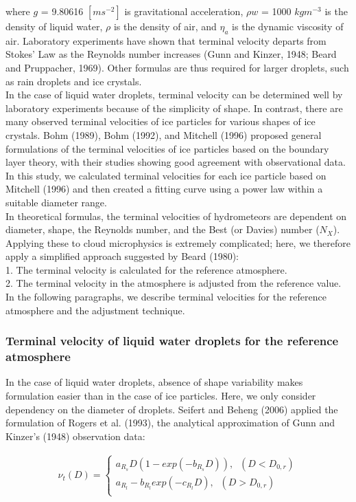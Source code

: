 where $g$ = 9.80616 $[m s^{-2}]$ is gravitational acceleration, $\rho w$ = 1000 $kg m^{-3}$ is the density of liquid water, $\rho$ is the density of air, and $\eta_{a}$ is the dynamic viscosity of air. Laboratory experiments have shown that terminal velocity departs from Stokes’ Law as the Reynolds number increases (Gunn and Kinzer, 1948; Beard and Pruppacher, 1969). Other formulas are thus required for larger droplets, such as rain droplets and ice crystals.\\
In the case of liquid water droplets, terminal velocity can be determined well by laboratory experiments because of the simplicity of shape. In contrast, there are many observed terminal velocities of ice particles for various shapes of ice crystals. Bohm (1989), Bohm (1992), and Mitchell (1996) proposed general formulations of the terminal velocities of ice particles based on the boundary layer theory, with their studies showing good agreement with observational data. In this study, we calculated terminal velocities for each ice particle based on Mitchell (1996) and then created a fitting curve using a power law within a suitable diameter range. \\
In theoretical formulas, the terminal velocities of hydrometeors are dependent on diameter, shape, the Reynolds number, and the Best (or Davies) number ($N_{X}$). Applying these to cloud microphysics is extremely complicated; here, we therefore apply a simplified approach suggested by Beard (1980):\\
1. The terminal velocity is calculated for the reference atmosphere.\\
2. The terminal velocity in the atmosphere is adjusted from the reference value.\\
In the following paragraphs, we describe terminal velocities for the reference atmosphere and the adjustment technique.

\subsubsection{Terminal velocity of liquid water droplets for the reference atmosphere}
In the case of liquid water droplets, absence of shape variability makes formulation easier than in the case of ice particles. Here, we only consider dependency on the diameter of droplets. Seifert and Beheng (2006) applied the formulation of Rogers et al. (1993), the analytical approximation of Gunn and Kinzer’s (1948) observation data:

\begin{eqnarray}
\nu_{t}(D)=
\left\{
\begin{array}{l}
a_{R_{s}}D(1-exp(-b_{R_{s}}D)),\;\;(D<D_{0,r}) \\
a_{R_{l}}-b_{R_{l}}exp(-c_{R_{l}}D),\;\;(D>D_{0,r}) \\
\label{sn13}
\end{array}
\right.
\end{eqnarray}

